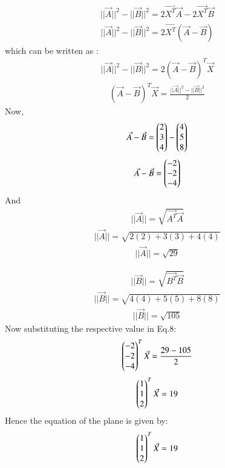 \documentclass[journal]{IEEEtran}
\theoremstyle{remark}
\begin{document}
\begin{align}
   ||\Vec{A}||^2-||\Vec{B}||^2=2\Vec{X^T}\Vec{A}-2\Vec{X^T}\Vec{B}
\end{align}
\begin{align}
    ||\Vec{A}||^2-||\Vec{B}||^2=2\Vec{X^T}(\Vec{A}-\Vec{B})
\end{align}
which can be written as :
\begin{align}
    ||\Vec{A}||^2-||\Vec{B}||^2=2(\Vec{A}-\Vec{B})^T\Vec{X}
\end{align}
\begin{align}
 (\Vec{A}-\Vec{B})^T\Vec{X}=\frac{||\Vec{A}||^2-||\Vec{B}||^2}{2}
\end{align}
Now,
\begin{align}
    \Vec{A}-\Vec{B}=\begin{pmatrix}2\\3\\4\end{pmatrix}-\begin{pmatrix}4\\5\\8\end{pmatrix}
\end{align}
\begin{align}
   \Vec{A}-\Vec{B}=\begin{pmatrix}-2\\-2\\-4\end{pmatrix}
\end{align}
And
\begin{align}
     ||\Vec{A}||=\sqrt{\Vec{A^T}\Vec{A}}
\end{align}
\begin{align}
    ||\Vec{A}||=\sqrt{2(2)+3(3)+4(4)}
\end{align}
\begin{align}
    ||\Vec{A}||=\sqrt{29}
\end{align}

\begin{align}
     ||\Vec{B}||=\sqrt{\Vec{B^T}\Vec{B}}
\end{align}
\begin{align}
     ||\Vec{B}||=\sqrt{4(4)+5(5)+8(8)}
\end{align}
\begin{align}
    ||\Vec{B}||=\sqrt{105}
\end{align}
Now substituting the respective value in Eq.8:
\begin{align}
     \begin{pmatrix}-2\\-2\\-4\end{pmatrix}^T\Vec{X}=\frac{29-105}{2}
\end{align}
\begin{align}
    \begin{pmatrix}1\\1\\2\end{pmatrix}^T\Vec{X}=19
\end{align}
Hence the equation of the plane is given by:
\begin{align}
    \begin{pmatrix}1\\1\\2\end{pmatrix}^T\Vec{X}=19
\end{align}
\end{document}
